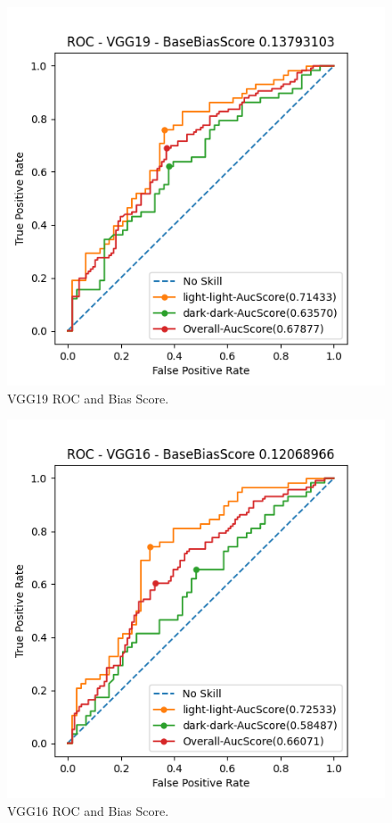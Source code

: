 \documentclass[conference]{IEEEtran}
\begin{document}
\begin{figure}[htbp]
    \centerline{\includegraphics[width=0.9\linewidth]{latex/images/VGG19.png}}
    \caption{VGG19 ROC and Bias Score.}
    \label{vgg19_roc}
\end{figure}

\begin{figure}[htbp]
    \centerline{\includegraphics[width=0.9\linewidth]{latex/images/VGG16.png}}
    \caption{VGG16 ROC and Bias Score.}
    \label{vgg16_roc}
\end{figure}
\end{document}
